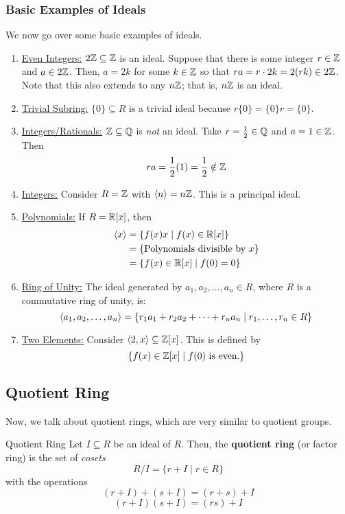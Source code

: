 \documentclass[letterpaper]{article}
\begin{document}
\subsubsection{Basic Examples of Ideals}
We now go over some basic examples of ideals. 
\begin{enumerate}
    \item \underline{Even Integers:} $2\mathbb{Z} \subseteq \mathbb{Z}$ is an ideal. Suppose that there is some integer $r \in \mathbb{Z}$ and $a \in 2\mathbb{Z}$. Then, $a = 2k$ for some $k \in \mathbb{Z}$ so that $ra = r \cdot 2k = 2(rk) \in 2\mathbb{Z}$. Note that this also extends to any $n\mathbb{Z}$; that is, $n\mathbb{Z}$ is an ideal. 
    \item \underline{Trivial Subring:} $\{0\} \subseteq R$ is a trivial ideal because $r \{0\} = \{0\} r = \{0\}$.
    \item \underline{Integers/Rationals:} $\mathbb{Z} \subseteq \mathbb{Q}$ is \emph{not} an ideal. Take $r = \frac{1}{2} \in \mathbb{Q}$ and $a = 1 \in \mathbb{Z}$. Then
    \[ra = \frac{1}{2} (1) = \frac{1}{2} \notin \mathbb{Z}\]
    \item \underline{Integers:} Consider $R = \mathbb{Z}$ with $\langle n \rangle = n\mathbb{Z}$. This is a principal ideal. 
    \item \underline{Polynomials:} If $R = \mathbb{R}[x]$, then
    \begin{equation*}
        \begin{aligned}
            \langle x \rangle &= \{f(x)x \mid f(x) \in \mathbb{R}[x]\} \\ 
                &= \{\text{Polynomials divisible by } x\} \\
                &= \{f(x) \in \mathbb{R}[x] \mid f(0) = 0\}
        \end{aligned}
    \end{equation*}
    \item \underline{Ring of Unity:} The ideal generated by $a_1, a_2, \dots, a_n \in R$, where $R$ is a commutative ring of unity, is:
    \[\langle a_1, a_2, \dots, a_n \rangle = \{r_1 a_1 + r_2 a_2 + \dots + r_n a_n \mid r_1, \dots, r_n \in R\}\]
    \item \underline{Two Elements:} Consider $\langle 2, x \rangle \subseteq \mathbb{Z}[x]$. This is defined by
    \[\{f(x) \in \mathbb{Z}[x] \mid f(0) \text{ is even.}\}\]
\end{enumerate}

\subsection{Quotient Ring}
Now, we talk about quotient rings, which are very similar to quotient groups. 
\begin{definition}{Quotient Ring}{}
    Let $I \subseteq R$ be an ideal of $R$. Then, the \textbf{quotient ring} (or factor ring) is the set of \emph{cosets}
    \[R / I = \{r + I \mid r \in R\}\]
    with the operations
    \[(r + I) + (s + I) = (r + s) + I\]
    \[(r + I)(s + I) = (rs) + I\]
\end{definition}
\end{document}
